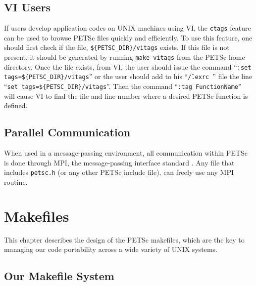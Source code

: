 {\section{VI Users}  \label{sec:vi}

 
If users develop 
application codes on UNIX machines using VI, the {\tt ctags} feature 
can be used to browse PETSc files quickly and efficiently.  To use 
this feature, one should first check if the file, {\tt \$\{PETSC\_DIR\}/vitags} 
exists.  If this file is not present, it should be generated by running 
{\tt make vitags} from the PETSc home directory. Once the file exists, 
from VI, the user should issue the command ``{\tt :set tags=\$\{PETSC\_DIR\}/vitags}'' 
or the user should add to
his ``{\tt \~/.exrc }'' file the line ``{\tt set tags=\$\{PETSC\_DIR\}/vitags}''.
Then the command ``{\tt :tag FunctionName}'' will cause VI 
to find the file and line number where a desired PETSc function 
is defined. 

\section{Parallel Communication}

When used in a message-passing environment, all communication 
within
PETSc is done through MPI, the message-passing interface standard
\cite{MPI-final}.  Any file that includes {\tt petsc.h} (or any other 
PETSc include file), can freely use any MPI routine.

\chapter{Makefiles}
\label{ch:makefiles}

This chapter describes the design of the PETSc makefiles, which are the
key to managing our code portability across a wide variety of UNIX systems.

\section{Our Makefile System}

}
